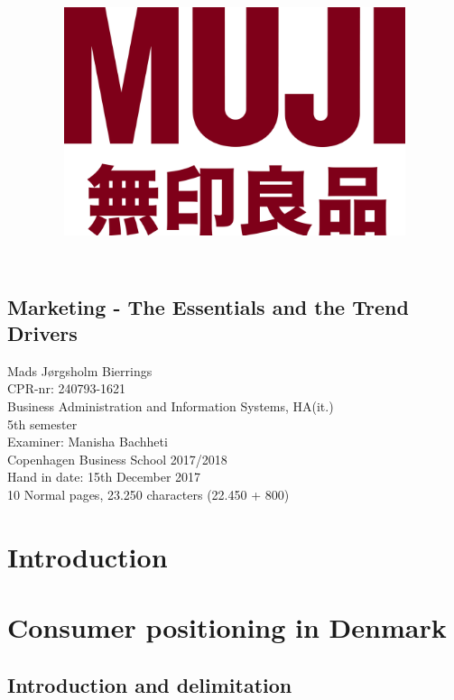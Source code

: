 \documentclass[a4paper,11pt,fleqn,dvipsnames,oneside,openright]{memoir}
\begin{document}
\title{\includegraphics[width=10cm]{MujiLogo.png}}
\maketitle

\section*{Marketing - The Essentials and the Trend Drivers}

Mads Jørgsholm Bierrings\\
CPR-nr: 240793-1621\\
Business Administration and Information Systems, HA(it.) \\
5th semester\\
Examiner: Manisha Bachheti\\
Copenhagen Business School 2017/2018\\
Hand in date: 15th December 2017\\
10 Normal pages, 23.250 characters (22.450 + 800)\\

\newpage

\tableofcontents*
{}
\thispagestyle{empty}

\mainmatter 

\chapter{Introduction}


\chapter{Consumer positioning in Denmark}
\label{Chapter2}
\section{Introduction and delimitation}

\end{document}
